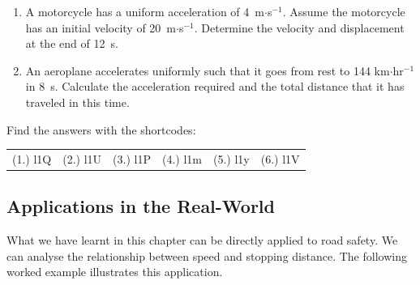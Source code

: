 \begin{enumerate}[noitemsep, label=\textbf{\arabic*}. ]
\label{m38796*uid149}\item A motorcycle has a uniform acceleration of 4~m\begin{math}\ensuremath{\cdot}\end{math}s\begin{math}{}^{-1}\end{math}. Assume the motorcycle has an initial velocity of 20~m\begin{math}\ensuremath{\cdot}\end{math}s\begin{math}{}^{-1}\end{math}. Determine the velocity and displacement at the end of 12~s.\newline
            
\label{m38796*uid150}\item An aeroplane accelerates uniformly such that it goes from rest to 144 km\begin{math}\ensuremath{\cdot}\end{math}hr\begin{math}{}^{-1}\end{math}in 8~s. Calculate the acceleration required and the total distance that it has traveled in this time.\newline
            
\end{enumerate}
        
          

        
      
    
    \label{m38796*cid11}
\par {} Find the answers with the shortcodes:
 \par \begin{tabular}[h]{cccccc}
 (1.) l1Q  &  (2.) l1U  &  (3.) l1P  &  (4.) l1m  &  (5.) l1y  &  (6.) l1V  & \end{tabular}



            \subsection{ Applications in the Real-World}
            \nopagebreak
            
      
      \label{m38796*id79860}What we have learnt in this chapter can be directly applied to road safety. We can analyse the relationship between speed and stopping distance. The following worked example illustrates this application.\par 
\label{m38796*secfhsst!!!underscore!!!id5870}\vspace{.5cm} 
      
